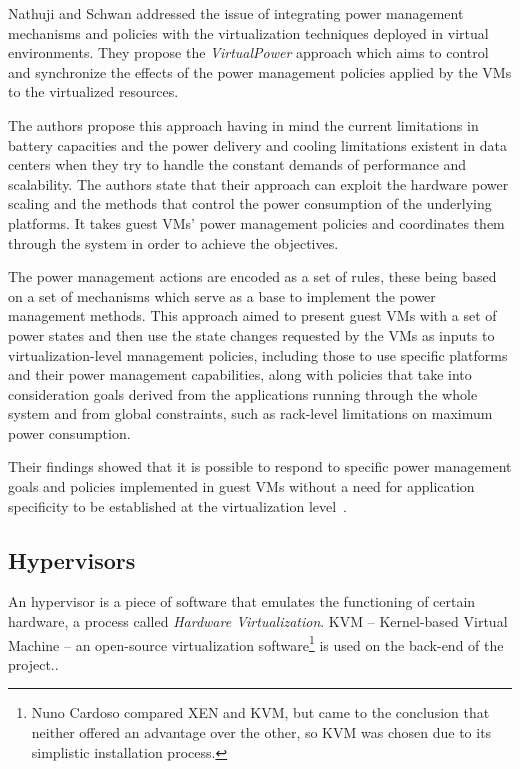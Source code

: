 Nathuji and Schwan addressed the issue of integrating power management mechanisms and policies with the virtualization techniques deployed in virtual environments. They propose the \textit{VirtualPower} approach which aims to control and synchronize the effects of the power management policies applied by the VMs to the virtualized resources. 

The authors propose this approach having in mind the current limitations in battery capacities and the power delivery and cooling limitations existent in data centers when they try to handle the constant demands of performance and scalability. The authors state that their approach  can exploit the hardware power scaling and the methods that control the power consumption of the underlying platforms. It takes guest VMs' power management policies and coordinates them through the system in order to achieve the objectives. 

The power management actions are encoded as a set of rules, these being based on a set of mechanisms which serve as a base to implement the power management methods. This approach aimed to present guest VMs with a set of power states and then use the state changes requested by the VMs as inputs to virtualization-level management policies, including those to use specific platforms and their power management capabilities, along with policies that take into consideration goals derived from the applications running through the whole system and from global constraints, such as rack-level limitations on maximum power consumption. 

Their findings showed that it is possible to respond to specific power management goals and policies implemented in guest VMs without a need for application specificity to be established at the virtualization level~\cite{virtualpower}.

\subsection{Hypervisors}\label{hyper}

An hypervisor is a piece of software that emulates the functioning of certain hardware, a process called \textit{Hardware Virtualization}. KVM -- Kernel-based Virtual Machine -- an open-source virtualization software\footnote{Nuno Cardoso compared XEN and KVM, but came to the conclusion that neither offered an advantage over the other, so KVM was chosen due to its simplistic installation process.} is used on the back-end of the project..

